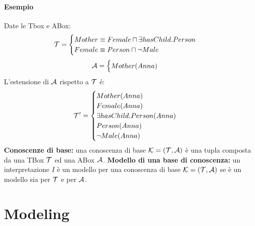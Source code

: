\documentclass[../main.tex]{subfiles}
\begin{document}
   \subsubsection{Esempio}
   Date le Tbox e ABox:
   \begin{equation*}
      \mathcal{T}=
      \begin{cases}
         Mother \equiv Female \sqcap \exists hasChild.Person\\
         Female \equiv Person \sqcap \lnot Male
      \end{cases}
   \end{equation*}
   \begin{equation*}
      \mathcal{A}=
      \begin{cases}
         Mother(Anna)
      \end{cases}
   \end{equation*}
   L'estensione di $\mathcal{A}$ rispetto a $\mathcal{T}$ é:
   \begin{equation*}
      \mathcal{T}^\prime=
      \begin{cases}
         Mother(Anna)\\
         Female(Anna)\\
         \exists hasChild.Person(Anna)\\
         Person(Anna)\\
         \lnot Male(Anna) 
      \end{cases}
   \end{equation*}
   \spazio
   \textbf{Conoscenze di base:} una conoscenza di base $\mathcal{K} = (\mathcal{T},\mathcal{A})$ è una tupla composta da una TBox $\mathcal{T}$ ed una ABox $\mathcal{A}$.
   \spazio
   \textbf{Modello di una base di conoscenza:} un interpretazione $I$ è un modello per una conoscenza di base $\mathcal{K} = (\mathcal{T},\mathcal{A})$ se è un modello sia per $\mathcal{T}$ e per $\mathcal{A}$.

   \chapter{Modeling}
\end{document}
